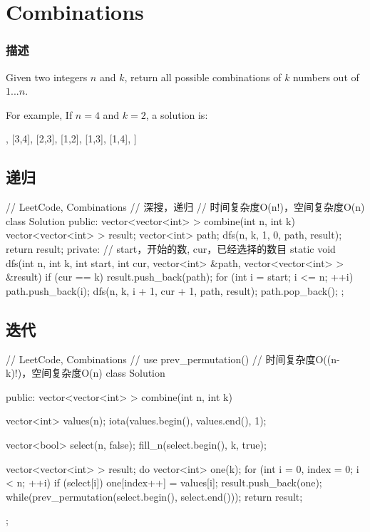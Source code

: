 \section{Combinations} %
\label{sec:combinations}


\subsubsection{描述}
Given two integers $n$ and $k$, return all possible combinations of $k$ numbers out of $1 ... n$.

For example,
If $n = 4$ and $k = 2$, a solution is:
\begin{Code}
	[
	[2,4],
	[3,4],
	[2,3],
	[1,2],
	[1,3],
	[1,4],
	]
\end{Code}


\subsection{递归}
\begin{Code}
	// LeetCode, Combinations
	// 深搜，递归
	// 时间复杂度O(n!)，空间复杂度O(n)
	class Solution {
		public:
		vector<vector<int> > combine(int n, int k) {
			vector<vector<int> > result;
			vector<int> path;
			dfs(n, k, 1, 0, path, result);
			return result;
		}
		private:
		// start，开始的数, cur，已经选择的数目
		static void dfs(int n, int k, int start, int cur,
		vector<int> &path, vector<vector<int> > &result) {
			if (cur == k) {
				result.push_back(path);
			}
			for (int i = start; i <= n; ++i) {
				path.push_back(i);
				dfs(n, k, i + 1, cur + 1, path, result);
				path.pop_back();
			}
		}
	};
\end{Code}


\subsection{迭代}
\begin{Code}
	// LeetCode, Combinations
	// use prev_permutation()
	// 时间复杂度O((n-k)!)，空间复杂度O(n)
	class Solution {
		public:
		vector<vector<int> > combine(int n, int k) {
			vector<int> values(n);
			iota(values.begin(), values.end(), 1);
			
			vector<bool> select(n, false);
			fill_n(select.begin(), k, true);
			
			vector<vector<int> > result;
			do{
				vector<int> one(k);
				for (int i = 0, index = 0; i < n; ++i)
				if (select[i])
				one[index++] = values[i];
				result.push_back(one);
			} while(prev_permutation(select.begin(), select.end()));
			return result;
		}
	};
\end{Code}


